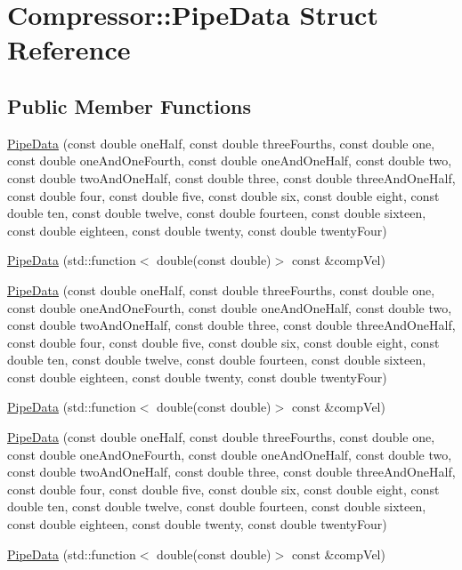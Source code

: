 \hypertarget{struct_compressor_1_1_pipe_data}{}\section{Compressor\+:\+:Pipe\+Data Struct Reference}
\label{struct_compressor_1_1_pipe_data}
\subsection*{Public Member Functions}
\begin{DoxyCompactItemize}
\item 
\hyperlink{struct_compressor_1_1_pipe_data_a2eb8afee8f68dd54dd1bf4d89b3188d9}{Pipe\+Data} (const double one\+Half, const double three\+Fourths, const double one, const double one\+And\+One\+Fourth, const double one\+And\+One\+Half, const double two, const double two\+And\+One\+Half, const double three, const double three\+And\+One\+Half, const double four, const double five, const double six, const double eight, const double ten, const double twelve, const double fourteen, const double sixteen, const double eighteen, const double twenty, const double twenty\+Four)
\item 
\hyperlink{struct_compressor_1_1_pipe_data_af7998fd533340b0a84e78fcda91b4806}{Pipe\+Data} (std\+::function$<$ double(const double)$>$ const \&comp\+Vel)
\item 
\hyperlink{struct_compressor_1_1_pipe_data_a2eb8afee8f68dd54dd1bf4d89b3188d9}{Pipe\+Data} (const double one\+Half, const double three\+Fourths, const double one, const double one\+And\+One\+Fourth, const double one\+And\+One\+Half, const double two, const double two\+And\+One\+Half, const double three, const double three\+And\+One\+Half, const double four, const double five, const double six, const double eight, const double ten, const double twelve, const double fourteen, const double sixteen, const double eighteen, const double twenty, const double twenty\+Four)
\item 
\hyperlink{struct_compressor_1_1_pipe_data_af7998fd533340b0a84e78fcda91b4806}{Pipe\+Data} (std\+::function$<$ double(const double)$>$ const \&comp\+Vel)
\item 
\hyperlink{struct_compressor_1_1_pipe_data_a2eb8afee8f68dd54dd1bf4d89b3188d9}{Pipe\+Data} (const double one\+Half, const double three\+Fourths, const double one, const double one\+And\+One\+Fourth, const double one\+And\+One\+Half, const double two, const double two\+And\+One\+Half, const double three, const double three\+And\+One\+Half, const double four, const double five, const double six, const double eight, const double ten, const double twelve, const double fourteen, const double sixteen, const double eighteen, const double twenty, const double twenty\+Four)
\item 
\hyperlink{struct_compressor_1_1_pipe_data_af7998fd533340b0a84e78fcda91b4806}{Pipe\+Data} (std\+::function$<$ double(const double)$>$ const \&comp\+Vel)
\end{DoxyCompactItemize}

